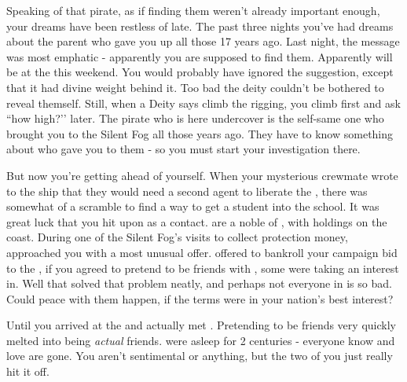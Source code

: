 \documentclass[char]{GL2020}
\begin{document}
Speaking of that pirate, as if finding them weren’t already important enough, your dreams have been restless of late. The past three nights you’ve had dreams about the parent who gave you up all those 17 years ago. Last night, the message was most emphatic - apparently you are supposed to find them. Apparently \cPirateChildParent{\they} will be at the \pSc{} this weekend. You would probably have ignored the suggestion, except that it had divine weight behind it. Too bad the deity couldn’t be bothered to reveal themself. Still, when a Deity says climb the rigging, you climb first and ask ``how high?’’ later. The pirate who is here undercover is the self-same one who brought you to the Silent Fog all those years ago. They have to know something about who gave you to them - so you must start your investigation there.

But now you’re getting ahead of yourself. When your mysterious crewmate wrote to the ship that they would need a second agent to liberate the \iNet{}, there was somewhat of a scramble to find a way to get a student into the school. It was great luck that you hit upon \cWildCard{} as a contact. \cWildCard{\They} are a noble\cWildCard{\person} of \pFarm{}, with holdings on the coast. During one of the Silent Fog’s visits to collect protection money, \cWildCard{} approached you with a most unusual offer. \cWildCard{\They} offered to bankroll your campaign bid to the \pSchool{}, if you agreed to pretend to be friends with \cDisney{}, some \cDisney{\kid} \cWildCard{\they} were taking an interest in. Well that solved that problem neatly, and perhaps not everyone in \pFarm{} is so bad.  Could peace with them happen, if the terms were in your nation’s best interest?

Until you arrived at the \pSchool{} and actually met \cDisney{}. Pretending to be friends very quickly melted into being \emph{actual} friends. \cDisney{\They} were asleep for 2 centuries - everyone \cDisney{\they} know and love are gone. You aren’t sentimental or anything, but the two of you just really hit it off.
\end{document}
